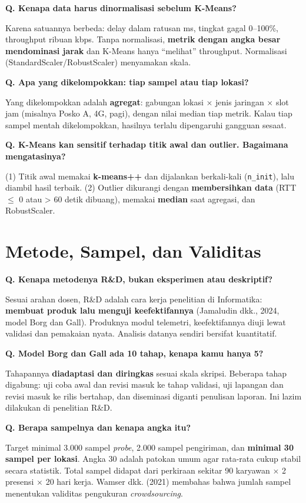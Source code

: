 \documentclass[11pt,a4paper]{article}
\newcounter{q}
\newcommand{\tanya}[2]{\stepcounter{q}%
\par\vspace{6pt}\noindent\colorbox{band}{\parbox{\dimexpr\linewidth-2\fboxsep}{\textbf{Q\arabic{q}. #1}}}\par\vspace{2pt}#2\par}
\begin{document}
\tanya{Kenapa data harus dinormalisasi sebelum K-Means?}{Karena satuannya berbeda: delay dalam ratusan ms, tingkat gagal 0--100\%, throughput ribuan kbps. Tanpa normalisasi, \textbf{metrik dengan angka besar mendominasi jarak} dan K-Means hanya ``melihat'' throughput. Normalisasi (StandardScaler/RobustScaler) menyamakan skala.}

\tanya{Apa yang dikelompokkan: tiap sampel atau tiap lokasi?}{Yang dikelompokkan adalah \textbf{agregat}: gabungan lokasi $\times$ jenis jaringan $\times$ slot jam (misalnya Posko A, 4G, pagi), dengan nilai median tiap metrik. Kalau tiap sampel mentah dikelompokkan, hasilnya terlalu dipengaruhi gangguan sesaat.}

\tanya{K-Means kan sensitif terhadap titik awal dan outlier. Bagaimana mengatasinya?}{(1) Titik awal memakai \textbf{k-means++} dan dijalankan berkali-kali (\texttt{n\_init}), lalu diambil hasil terbaik. (2) Outlier dikurangi dengan \textbf{membersihkan data} (RTT $\le$ 0 atau > 60 detik dibuang), memakai \textbf{median} saat agregasi, dan RobustScaler.}

\section{Metode, Sampel, dan Validitas}

\tanya{Kenapa metodenya R\&D, bukan eksperimen atau deskriptif?}{Sesuai arahan dosen, R\&D adalah cara kerja penelitian di Informatika: \textbf{membuat produk lalu menguji keefektifannya} (Jamaludin dkk., 2024, model Borg dan Gall). Produknya modul telemetri, keefektifannya diuji lewat validasi dan pemakaian nyata. Analisis datanya sendiri bersifat kuantitatif.}

\tanya{Model Borg dan Gall ada 10 tahap, kenapa kamu hanya 5?}{Tahapannya \textbf{diadaptasi dan diringkas} sesuai skala skripsi. Beberapa tahap digabung: uji coba awal dan revisi masuk ke tahap validasi, uji lapangan dan revisi masuk ke rilis bertahap, dan diseminasi diganti penulisan laporan. Ini lazim dilakukan di penelitian R\&D.}

\tanya{Berapa sampelnya dan kenapa angka itu?}{Target minimal 3.000 sampel \textit{probe}, 2.000 sampel pengiriman, dan \textbf{minimal 30 sampel per lokasi}. Angka 30 adalah patokan umum agar rata-rata cukup stabil secara statistik. Total sampel didapat dari perkiraan sekitar 90 karyawan $\times$ 2 presensi $\times$ 20 hari kerja. Wamser dkk. (2021) membahas bahwa jumlah sampel menentukan validitas pengukuran \textit{crowdsourcing}.}
\end{document}

